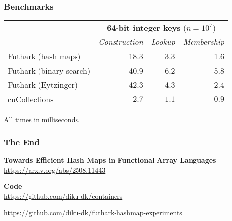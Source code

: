 \documentclass[aspectratio=169]{beamer}
\begin{document}
\begin{frame}\frametitle{Benchmarks}
  \begin{center}
    \begin{tabular}{l|rrr}
      & \multicolumn{3}{c}{\textbf{64-bit integer keys} ($n=10^{7}$)} \\
      & \textit{Construction} & \textit{Lookup} & \textit{Membership} \\\midrule
      Futhark (hash maps) & 18.3 & 3.3 & 1.6 \\
      Futhark (binary search) & 40.9 & 6.2 & 5.8 \\
      Futhark (Eytzinger) & 42.3 & 4.3 & 2.4 \\
      cuCollections & $2.7$ & $1.1$ & $0.9$ \\
    \end{tabular}
    \vspace{0.5cm}
    
    All times in milliseconds.
  \end{center}
\end{frame}

\begin{frame}\frametitle{The End}
  \begin{center}
    \textbf{Towards Efficient Hash Maps in Functional Array Languages}\\
    \vspace{0.25cm}
    \url{https://arxiv.org/abs/2508.11443}

    \vspace{1cm}
    \textbf{Code} \\
    \vspace{0.25cm}
    \url{https://github.com/diku-dk/containers}

    \vspace{0.25cm}
    \url{https://github.com/diku-dk/futhark-hashmap-experiments}
  \end{center}
\end{frame}
\end{document}
